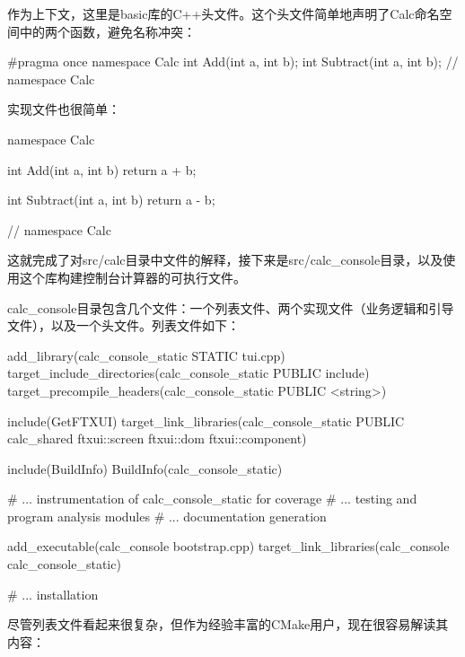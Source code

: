 作为上下文，这里是basic库的C++头文件。这个头文件简单地声明了Calc命名空间中的两个函数，避免名称冲突：


\begin{cpp}
#pragma once
namespace Calc {
    int Add(int a, int b);
    int Subtract(int a, int b);
} // namespace Calc
\end{cpp}

实现文件也很简单：


\begin{cpp}
namespace Calc {
    int Add(int a, int b) {
        return a + b;
    }

    int Subtract(int a, int b) {
        return a - b;
    }
} // namespace Calc
\end{cpp}

这就完成了对src/calc目录中文件的解释，接下来是src/calc\_console目录，以及使用这个库构建控制台计算器的可执行文件。


calc\_console目录包含几个文件：一个列表文件、两个实现文件（业务逻辑和引导文件），以及一个头文件。列表文件如下：


\begin{cmake}
add_library(calc_console_static STATIC tui.cpp)
target_include_directories(calc_console_static PUBLIC include)
target_precompile_headers(calc_console_static PUBLIC <string>)

include(GetFTXUI)
target_link_libraries(calc_console_static PUBLIC calc_shared
                      ftxui::screen ftxui::dom ftxui::component)

include(BuildInfo)
BuildInfo(calc_console_static)

# ... instrumentation of calc_console_static for coverage
# ... testing and program analysis modules
# ... documentation generation

add_executable(calc_console bootstrap.cpp)
target_link_libraries(calc_console calc_console_static)

# ... installation
\end{cmake}

尽管列表文件看起来很复杂，但作为经验丰富的CMake用户，现在很容易解读其内容：

